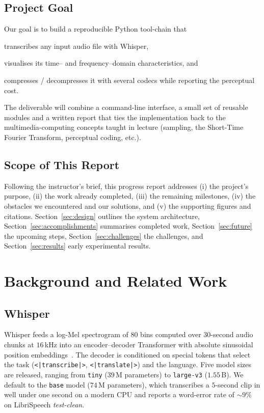 \documentclass[twocolumn,10pt,a4paper]{article}
\begin{document}
\subsection{Project Goal}
Our goal is to build a reproducible Python tool-chain that
\begin{enumerate*}[label=(\alph*)]
  \item transcribes any input audio file with Whisper,
  \item visualises its time-- and frequency--domain characteristics, and
  \item compresses / decompresses it with several codecs while reporting
        the perceptual cost.
\end{enumerate*}
The deliverable will combine a command-line interface, a small set of
reusable modules and a written report that ties the implementation back to
the multimedia-computing concepts taught in lecture (sampling, the
Short-Time Fourier Transform, perceptual coding, etc.).

\subsection{Scope of This Report}
Following the instructor's brief, this progress report addresses
(i) the project's purpose, (ii) the work already completed, (iii) the
remaining milestones, (iv) the obstacles we encountered and our solutions,
and (v) the supporting figures and citations.  Section~\ref{sec:design}
outlines the system architecture, Section~\ref{sec:accomplishments}
summarises completed work, Section~\ref{sec:future} the upcoming steps,
Section~\ref{sec:challenges} the challenges, and
Section~\ref{sec:results} early experimental results.

\section{Background and Related Work}\label{sec:background}
\subsection{Whisper}
Whisper feeds a log-Mel spectrogram of $80$ bins computed over $30$-second
audio chunks at $16$\,kHz into an encoder--decoder Transformer with
absolute sinusoidal position embeddings~\cite{radford2022whisper}.  The
decoder is conditioned on special tokens that select the task
(\texttt{<|transcribe|>}, \texttt{<|translate|>}) and the language.
Five model sizes are released, ranging from \texttt{tiny} ($39$\,M
parameters) to \texttt{large-v3} ($1.55$\,B).  We default to the
\texttt{base} model ($74$\,M parameters), which transcribes a
$5$-second clip in well under one second on a modern CPU and reports a
word-error rate of $\sim 9\%$ on LibriSpeech \emph{test-clean}.
\end{document}

